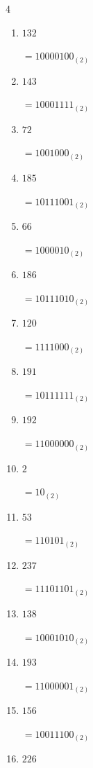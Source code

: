 \begin{multicols}{4}
\begin{enumerate}
        $=11001000_{(2)}$

  \item $132$

        $=10000100_{(2)}$

  \item $143$

        $=10001111_{(2)}$

  \item $72$

        $=1001000_{(2)}$

  \item $185$

        $=10111001_{(2)}$

  \item $66$

        $=1000010_{(2)}$

  \item $186$

        $=10111010_{(2)}$

  \item $120$

        $=1111000_{(2)}$

  \item $191$

        $=10111111_{(2)}$

  \item $192$

        $=11000000_{(2)}$

  \item $2$

        $=10_{(2)}$

  \item $53$

        $=110101_{(2)}$

  \item $237$

        $=11101101_{(2)}$

  \item $138$

        $=10001010_{(2)}$

\columnbreak %

\resetques

  \item $193$

        $=11000001_{(2)}$

  \item $156$

        $=10011100_{(2)}$

  \item $226$


\end{enumerate}
\end{multicols}
